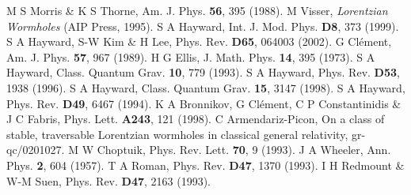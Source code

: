 \documentclass[aps,showpacs,twocolumn,draft,eqsecnum]{revtex4}
\begin{document}
\begin{references}
M S Morris \& K S Thorne, {Am. J. Phys.} {\bf 56}, 395 (1988).
M Visser, {\em Lorentzian Wormholes} (AIP Press, 1995).
S A Hayward, {Int. J. Mod. Phys.} {\bf D8}, 373 (1999).
S A Hayward, S-W Kim \& H Lee, {Phys. Rev.} {\bf D65}, 064003
(2002).
G Cl\'ement, {Am. J. Phys.} {\bf 57}, 967 (1989).
H G Ellis, {J. Math. Phys.} {\bf 14}, 395 (1973).
S A Hayward, {Class. Quantum Grav.} {\bf 10}, 779 (1993).
S A Hayward, {Phys. Rev.} {\bf D53}, 1938 (1996).
S A Hayward, {Class. Quantum Grav.} {\bf 15}, 3147 (1998).
S A Hayward, {Phys. Rev.} {\bf D49}, 6467 (1994).
K A Bronnikov, G Cl\'ement, C P Constantinidis \& J C Fabris,
{Phys. Lett.} {\bf A243}, 121 (1998).
C Armendariz-Picon, On a class of stable, traversable Lorentzian
wormholes in classical general relativity, gr-qc/0201027.
M W Choptuik, {Phys. Rev. Lett.} {\bf 70}, 9 (1993).
J A Wheeler, {Ann. Phys.} {\bf 2}, 604 (1957).
T A Roman, {Phys. Rev.} {\bf D47}, 1370 (1993).
I H Redmount \& W-M Suen, {Phys. Rev.} {\bf D47}, 2163 (1993).
\end{references}
\end{document}
